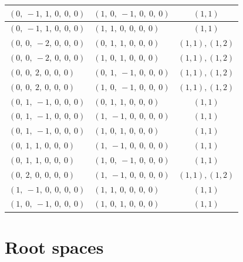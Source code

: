 \documentclass[11pt]{article}
\theoremstyle{definition}
\begin{document}
\begin{center}
\begin{tabular}{|l|l|c|}
    \hline
    $\left( 0, \  -1, \  1, \  0, \  0, \  0\right)$ & $\left( 1, \  0, \  -1, \  0, \  0, \  0\right)$ & $(1,1)$ \\
    \hline
    $\left( 0, \  -1, \  1, \  0, \  0, \  0\right)$ & $\left( 1, \  1, \  0, \  0, \  0, \  0\right)$ & $(1,1)$ \\
    \hline
    $\left( 0, \  0, \  -2, \  0, \  0, \  0\right)$ & $\left( 0, \  1, \  1, \  0, \  0, \  0\right)$ & $(1,1), (1,2)$ \\
    \hline
    $\left( 0, \  0, \  -2, \  0, \  0, \  0\right)$ & $\left( 1, \  0, \  1, \  0, \  0, \  0\right)$ & $(1,1), (1,2)$ \\
    \hline
    $\left( 0, \  0, \  2, \  0, \  0, \  0\right)$ & $\left( 0, \  1, \  -1, \  0, \  0, \  0\right)$ & $(1,1), (1,2)$ \\
    \hline
    $\left( 0, \  0, \  2, \  0, \  0, \  0\right)$ & $\left( 1, \  0, \  -1, \  0, \  0, \  0\right)$ & $(1,1), (1,2)$ \\
    \hline
    $\left( 0, \  1, \  -1, \  0, \  0, \  0\right)$ & $\left( 0, \  1, \  1, \  0, \  0, \  0\right)$ & $(1,1)$ \\
    \hline
    $\left( 0, \  1, \  -1, \  0, \  0, \  0\right)$ & $\left( 1, \  -1, \  0, \  0, \  0, \  0\right)$ & $(1,1)$ \\
    \hline
    $\left( 0, \  1, \  -1, \  0, \  0, \  0\right)$ & $\left( 1, \  0, \  1, \  0, \  0, \  0\right)$ & $(1,1)$ \\
    \hline
    $\left( 0, \  1, \  1, \  0, \  0, \  0\right)$ & $\left( 1, \  -1, \  0, \  0, \  0, \  0\right)$ & $(1,1)$ \\
    \hline
    $\left( 0, \  1, \  1, \  0, \  0, \  0\right)$ & $\left( 1, \  0, \  -1, \  0, \  0, \  0\right)$ & $(1,1)$ \\
    \hline
    $\left( 0, \  2, \  0, \  0, \  0, \  0\right)$ & $\left( 1, \  -1, \  0, \  0, \  0, \  0\right)$ & $(1,1), (1,2)$ \\
    \hline
    $\left( 1, \  -1, \  0, \  0, \  0, \  0\right)$ & $\left( 1, \  1, \  0, \  0, \  0, \  0\right)$ & $(1,1)$ \\
    \hline
    $\left( 1, \  0, \  -1, \  0, \  0, \  0\right)$ & $\left( 1, \  0, \  1, \  0, \  0, \  0\right)$ & $(1,1)$ \\
    \hline
\end{tabular}
\end{center}


\section{Root spaces}
\end{document}
